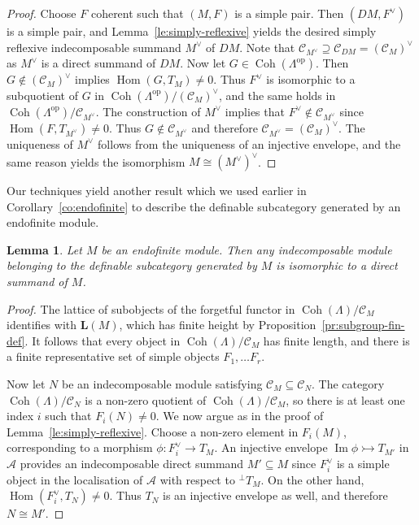\documentclass[a4paper]{amsart}
\theoremstyle{plain}
\newtheorem{lem}[thm]{Lemma}
\theoremstyle{definition}
\theoremstyle{remark}
\numberwithin{equation}{section}
\newcommand{\Coh}{\operatorname{Coh}}
\newcommand{\Hom}{\operatorname{Hom}}
\renewcommand{\Im}{\operatorname{Im}}
\newcommand{\op}{\mathrm{op}}
\def\A{\mathcal A}
\def\C{\mathcal C}
\def\bfL{\mathbf L}
\def\bfL{\mathbf L}
\begin{document}
\begin{proof}
Choose $F$ coherent such that $(M,F)$ is a simple pair. Then $(DM,F^\vee)$ is a simple pair, and Lemma~\ref{le:simply-reflexive} yields the desired simply reflexive indecomposable summand $M^\vee$ of $DM$. Note that $\C_{M^\vee}\supseteq \C_{DM}=(\C_M)^\vee$ as $M^\vee$ is a direct summand of $DM$. Now let $G\in\Coh(\Lambda^\op)$. Then $G\not\in (\C_M)^\vee$ implies $\Hom(G,T_M)\neq 0$. Thus $F^\vee$ is isomorphic to a subquotient of $G$ in $\Coh(\Lambda^\op)/(\C_M)^\vee$, and the same holds in $\Coh(\Lambda^\op)/\C_{M^\vee}$. The construction of $M^\vee$ implies that $F^\vee\not\in\C_{M^\vee}$ since $\Hom(F,T_{M^\vee})\neq 0$. Thus $G\not\in \C_{M^\vee}$ and therefore $\C_{M^\vee}=(\C_M)^\vee$. The uniqueness of $M^\vee$ follows from the uniqueness of an injective envelope, and the same reason yields the isomorphism $M\cong (M^\vee)^\vee$.
\end{proof}  

Our techniques yield another result which we used earlier in Corollary~\ref{co:endofinite} to describe the definable subcategory generated by an endofinite module.

\begin{lem}\label{le:simply-reflexive-endofinite}
Let $M$ be an endofinite module. Then any indecomposable module belonging to the definable subcategory generated by $M$ is isomorphic to a direct summand of $M$.
\end{lem}

\begin{proof}
The lattice of subobjects of the forgetful functor in $\Coh(\Lambda)/\C_M$ identifies with $\bfL(M)$, which has finite height by Proposition~\ref{pr:subgroup-fin-def}. It follows that every object in $\Coh(\Lambda)/\C_M$ has finite length, and there is a finite representative set of simple objects $F_1,\ldots F_r$.

Now let $N$ be an indecomposable module satisfying $\C_M\subseteq\C_N$. The category $\Coh(\Lambda)/\C_N$ is a non-zero quotient of $\Coh(\Lambda)/\C_M$, so there is at least one index $i$ such that $F_i(N)\neq0$. We now argue as in the proof of Lemma~\ref{le:simply-reflexive}. Choose a non-zero element in $F_i(M)$, corresponding to a morphism $\phi\colon F_i^\vee\to T_M$. An injective envelope $\Im\phi\rightarrowtail T_{M'}$ in $\A$ provides an indecomposable direct summand $M'\subseteq M$ since $F_i^\vee$ is a simple object in the localisation of $\A$ with respect to $^\perp{T_M}$. On the other hand, $\Hom(F_i^\vee,T_N)\neq 0$. Thus $T_N$ is an injective envelope as well, and therefore $N\cong M'$.
\end{proof}
\end{document}
